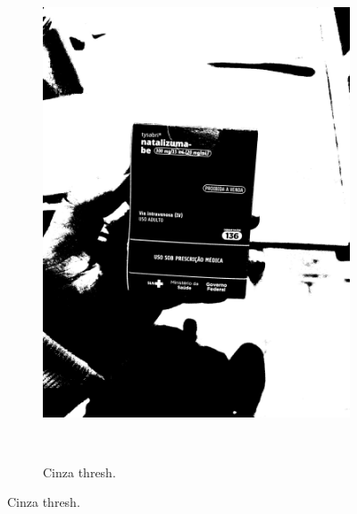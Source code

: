 \begin{figure}[htb]
\begin{subfigure}[t]{0.21\textwidth}
        \includegraphics[width=\linewidth]{../pictures/tysabri_rgb_b_only_thresh.jpg}
    \end{subfigure}
    \\\vspace{\floatsep}
    \begin{subfigure}[t]{0.21\textwidth}
        \centering
        \caption{Cinza thresh.}
        \label{fig:foto:versoes:1:Cinza_thresh:boxes}

\end{subfigure}
\end{figure}
